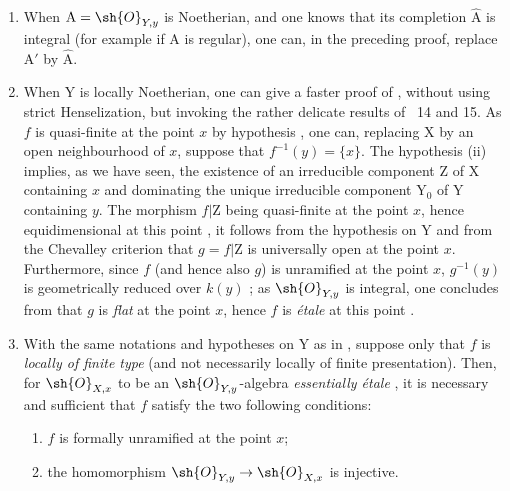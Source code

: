 \begin{remark}[18.10.2]
\label{IV.18.10.2}
\medskip\noindent
\begin{enumerate}[label=(\roman*)]
  \item When $\mathrm{A}=\sh{O}_{Y,y}$ is Noetherian, and one knows that its completion $\hat{\mathrm{A}}$ is integral (for example if $\mathrm{A}$ is regular), one can, in the preceding proof, replace $\mathrm{A}'$ by $\hat{\mathrm{A}}$.
  \item When $\mathrm{Y}$ is locally Noetherian, one can give a faster proof of , without using strict Henselization, but invoking the rather delicate results of \textsection\textsection~14 and 15.
As $f$ is quasi-finite at the point $x$ by hypothesis , one can, replacing $\mathrm{X}$ by an open neighbourhood of $x$, suppose that $f^{-1}(y)=\{x\}$.
The hypothesis (ii) implies, as we have seen, the existence of an irreducible component $\mathrm{Z}$ of $\mathrm{X}$ containing $x$ and dominating the unique irreducible component $\mathrm{Y}_0$ of $\mathrm{Y}$ containing $y$.
The morphism $f|\mathrm{Z}$ being quasi-finite at the point $x$, hence equidimensional at this point , it follows from the hypothesis on $\mathrm{Y}$ and from the Chevalley criterion  that $g=f|\mathrm{Z}$ is universally open at the point $x$.
Furthermore, since $f$ (and hence also $g$) is unramified at the point $x$, $g^{-1}(y)$ is geometrically reduced over $k(y)$ ; as $\sh{O}_{Y,y}$ is integral, one concludes from  that $g$ is \emph{flat} at the point $x$, hence $f$ is \emph{\'etale} at this point .
  \item With the same notations and hypotheses on $\mathrm{Y}$ as in , suppose only that $f$ is \emph{locally of finite type} (and not necessarily locally of finite presentation).
Then, for $\sh{O}_{X,x}$ to be an $\sh{O}_{Y,y}$-algebra \emph{essentially \'etale} , it is necessary and sufficient that $f$ satisfy the two following conditions:
\begin{enumerate}[label=\arabic*\textsuperscript{o}]
  \item $f$ is formally unramified at the point $x$;
  \item the homomorphism $\sh{O}_{Y,y}\to\sh{O}_{X,x}$ is injective.
\end{enumerate}


\end{enumerate}
\end{remark}
